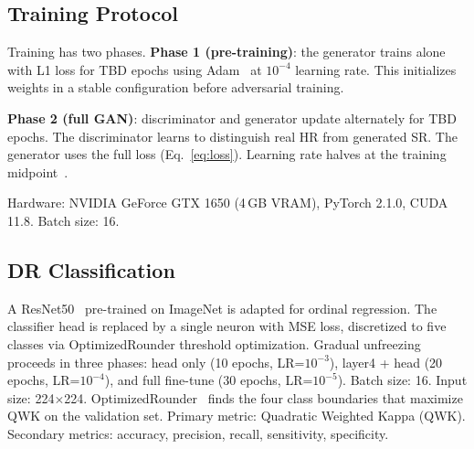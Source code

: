 \subsection{Training Protocol}

Training has two phases.
\textbf{Phase 1 (pre-training)}: the generator trains alone with L1 loss for TBD epochs using Adam~\cite{kingma2014} at $10^{-4}$ learning rate.
This initializes weights in a stable configuration before adversarial training.

\textbf{Phase 2 (full GAN)}: discriminator and generator update alternately for TBD epochs.
The discriminator learns to distinguish real HR from generated SR.
The generator uses the full loss (Eq.~\ref{eq:loss}).
Learning rate halves at the training midpoint~\cite{ledig2017}.

Hardware: NVIDIA GeForce GTX 1650 (4\,GB VRAM), PyTorch 2.1.0, CUDA 11.8.
Batch size: 16.

\subsection{DR Classification}

A ResNet50~\cite{he2016} pre-trained on ImageNet is adapted for ordinal regression.
The classifier head is replaced by a single neuron with MSE loss, discretized to five classes via OptimizedRounder threshold optimization.
Gradual unfreezing proceeds in three phases: head only (10 epochs, LR=$10^{-3}$), layer4 + head (20 epochs, LR=$10^{-4}$), and full fine-tune (30 epochs, LR=$10^{-5}$).
Batch size: 16. Input size: 224$\times$224.
OptimizedRounder~\cite{kingma2014} finds the four class boundaries that maximize QWK on the validation set.
Primary metric: Quadratic Weighted Kappa (QWK).
Secondary metrics: accuracy, precision, recall, sensitivity, specificity.
